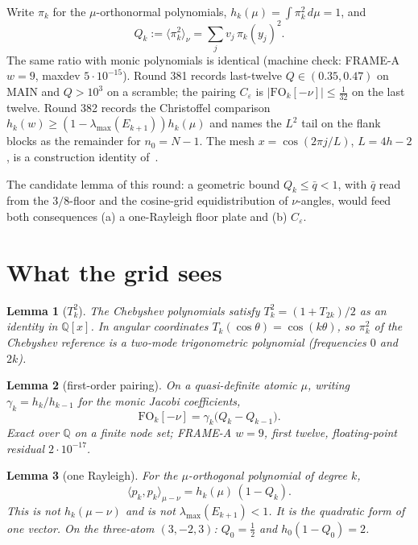 \documentclass[11pt]{article}
\newtheorem{lemma}{Lemma}
\theoremstyle{remark}
\newcommand{\Q}{\mathbb{Q}}
\begin{document}
Write $\pi_k$ for the $\mu$-orthonormal polynomials,
$h_k(\mu)=\int\pi_k^2\,d\mu=1$, and
\begin{equation}\label{eq:Qk}
Q_k
:=
\langle\pi_k^2\rangle_\nu
=
\sum_j v_j\,\pi_k(y_j)^2.
\end{equation}
The same ratio with monic polynomials is identical
(machine check: FRAME-A $w=9$, maxdev $5\cdot10^{-15}$).
Round 381 records last-twelve $Q\in(0.35,0.47)$ on MAIN and
$Q>10^3$ on a scramble; the pairing $C_\varepsilon$ is
$\lvert\mathrm{FO}_k[-\nu]\rvert\le\tfrac1{32}$ on the last twelve.
Round 382 records the Christoffel comparison
$h_k(w)\ge(1-\lambda_{\max}(E_{k+1}))h_k(\mu)$ and names the
$L^2$ tail on the flank blocks as the remainder for $n_0=N-1$.
The mesh $x=\cos(2\pi j/L)$, $L=4h-2$, is a construction identity
of~\cite{v3p}.

The candidate lemma of this round: a geometric bound
$Q_k\le\bar q<1$, with $\bar q$ read from the $3/8$-floor and
the cosine-grid equidistribution of $\nu$-angles, would feed both
consequences (a) a one-Rayleigh floor plate and (b) $C_\varepsilon$.

\section{What the grid sees}\label{sec:grid}

\begin{lemma}[$T_k^2$]\label{lem:t2}
The Chebyshev polynomials satisfy $T_k^2=(1+T_{2k})/2$ as an
identity in $\Q[x]$.  In angular coordinates
$T_k(\cos\theta)=\cos(k\theta)$, so $\pi_k^2$ of the Chebyshev
reference is a two-mode trigonometric polynomial (frequencies
$0$ and $2k$).
\end{lemma}

\begin{lemma}[first-order pairing]\label{lem:fo}
On a quasi-definite atomic $\mu$, writing $\gamma_k=h_k/h_{k-1}$
for the monic Jacobi coefficients,
\[
\mathrm{FO}_k[-\nu]
=
\gamma_k\bigl(Q_k-Q_{k-1}\bigr).
\]
Exact over $\Q$ on a finite node set; FRAME-A $w=9$, first twelve,
floating-point residual $2\cdot10^{-17}$.
\end{lemma}

\begin{lemma}[one Rayleigh]\label{lem:ray}
For the $\mu$-orthogonal polynomial of degree $k$,
\[
\langle p_k,p_k\rangle_{\mu-\nu}
=
h_k(\mu)\,(1-Q_k).
\]
This is \emph{not} $h_k(\mu-\nu)$ and is \emph{not}
$\lambda_{\max}(E_{k+1})<1$.  It is the quadratic form of one
vector.  On the three-atom $(3,-2,3)$: $Q_0=\tfrac12$ and
$h_0(1-Q_0)=2$.
\end{lemma}
\end{document}
